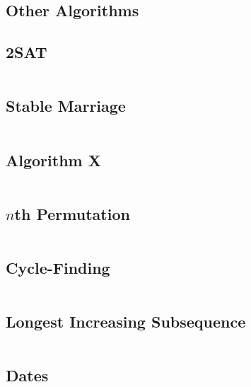 \documentclass[8pt,a4paper,landscape,oneside]{amsart}
\newcommand{\code}[1]{\inputminted[fontsize=\normalsize,baselinestretch=1]{cpp}{_code/#1}}
\newif\ifverbose
\begin{document}
\begin{multicols*}{3}
\section{Other Algorithms}
    \subsection{2SAT}
        \ifverbose
        A fast 2SAT solver.
        \fi
        \code{other/two_sat.cpp}

    \subsection{Stable Marriage}
        \ifverbose
        The Gale-Shapley algorithm for solving the stable marriage problem.
        \fi
        \code{other/stable_marriage.cpp}

    \subsection{Algorithm X}
        \ifverbose
        An implementation of Knuth's Algorithm X, using dancing links. Solves the Exact Cover problem.
        \fi
        \code{other/algorithm_x.cpp}

    \subsection{$n$th Permutation}
        \ifverbose
        A very fast algorithm for computing the $n$th permutation of the list
        $\{0,1,\ldots,k-1\}$.
        \fi
        \code{other/nth_permutation.cpp}

    \subsection{Cycle-Finding}
        \ifverbose
        An implementation of Floyd's Cycle-Finding algorithm.
        \fi
        \code{other/floyds_algorithm.cpp}

    \subsection{Longest Increasing Subsequence}
        \code{other/lis.cpp}

    \subsection{Dates}
        \ifverbose
        Functions to simplify date calculations.
        \fi
        \code{other/dates.cpp}


\end{multicols*}
\end{document}
